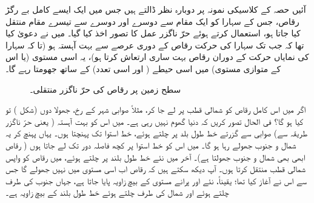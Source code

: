 آئیں حصہ  کے کلاسیکی نمونہ پر دوبارہ نظر ڈالتے ہیں جس میں ایک ایسے کامل بے رگڑ رقاص، جس کے سہارا کو ایک مقام سے دوسرے اور دوسرے سے تیسرے مقام منتقل کیا جاتا ہو، استعمال کرتے ہوئے حرّ ناگزر عمل کا تصور اخذ کیا گیا۔ میں نے دعویٰ کیا تھا کہ جب تک سہارا کی حرکت رقاص کے دوری عرصے سے بہت آہستہ ہو (تا کہ سہارا کی نمایاں حرکت کے دوران رقاص بہت ساری ارتعاش کرتا ہو)، یہ اسی مستوی (یا اس کے متوازی مستوی) میں اسی حیطے ( اور اسی تعدد) کے ساتھ جھومتا رہے گا۔
\begin{figure}
\centering
{}
\caption{سطح زمین پر رقاص کی حرّ ناگزر منتقلی۔}
\label{شکل_حرارت_نا_گزر_سطح_زمین_منتقل}
\end{figure}



 اگر میں اس کامل رقاص کو شمالی قطب پر لے جا کر، مثلاً صوابی شہر کے رخ، جھولا دوں (شکل ) تو کیا ہو گا؟ فی الحال تصور کریں کہ دنیا گھوم نہیں رہی ہے۔ میں اس کو بہت آہستہ ( یعنی حرّ ناگزر طریقہ سے) صوابی سے گزرتے خط طول بلد پر چلتے ہوئے، خط استوا تک پہنچتا ہوں۔ یہاں پہنچ کر یہ شمال و جنوب جھولے رہا ہو گا۔ میں اس کو خط استوا پر کچھ فاصلہ دور تک لے جاتا ہوں ( رقاص ابھی بھی شمال و جنوب جھولتا ہے)۔ آخر میں نئے خط طول بلند پر چلتے ہوئے، میں رقاص کو واپس شمالی قطب منتقل کرتا ہوں۔ آپ دیکھ سکتے ہیں کہ رقاص اب اسی مستوی میں نہیں جھولے گا جس سے اس نے آغاز کیا تھا؛ یقیناً، نئے اور پرانے مستوی کے بیچ زاویہ  پایا جاتا ہے، جہاں جنوب کی طرف چلتے ہوئے اور شمال کی طرف چلتے ہوئے خط طول بلند کے بیچ زاویہ  ہے۔ 
 
